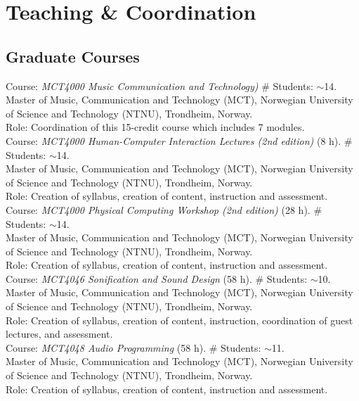 \documentclass[10pt, a4paper]{article}
\newcommand{\years}[1]{\marginnote{\scriptsize #1}}
\begin{document}
{{%
\section*{Teaching \& Coordination}

\subsection*{Graduate Courses}
\noindent

\years{10/2019}Course: \emph{MCT4000 Music Communication and Technology)} \# Students: $\sim$14. \\
Master of Music, Communication and Technology (MCT), Norwegian University of Science and Technology (NTNU), Trondheim, Norway.\\ 
Role: Coordination of this 15-credit course which includes 7 modules.\\
\years{10/2019}Course: \emph{MCT4000 Human-Computer Interaction Lectures (2nd edition)} (8 h). \# Students: $\sim$14. \\
Master of Music, Communication and Technology (MCT), Norwegian University of Science and Technology (NTNU), Trondheim, Norway.\\ 
Role: Creation of syllabus, creation of content, instruction and assessment.\\
\years{10/2019}Course: \emph{MCT4000 Physical Computing Workshop (2nd edition)} (28 h). \# Students: $\sim$14. \\
Master of Music, Communication and Technology (MCT), Norwegian University of Science and Technology (NTNU), Trondheim, Norway.\\ 
Role: Creation of syllabus, creation of content, instruction and assessment.\\
\years{1/2019}Course: \emph{MCT4046 Sonification and Sound Design} (58 h). \# Students: $\sim$10. \\
Master of Music, Communication and Technology (MCT), Norwegian University of Science and Technology (NTNU), Trondheim, Norway.\\ 
Role: Creation of syllabus, creation of content, instruction, coordination of guest lectures, and assessment.\\
\years{1/2019}Course: \emph{MCT4048 Audio Programming} (58 h). \# Students: $\sim$11. \\
Master of Music, Communication and Technology (MCT), Norwegian University of Science and Technology (NTNU), Trondheim, Norway.\\ 
Role: Creation of syllabus, creation of content, instruction and assessment.\\
}}
\end{document}

